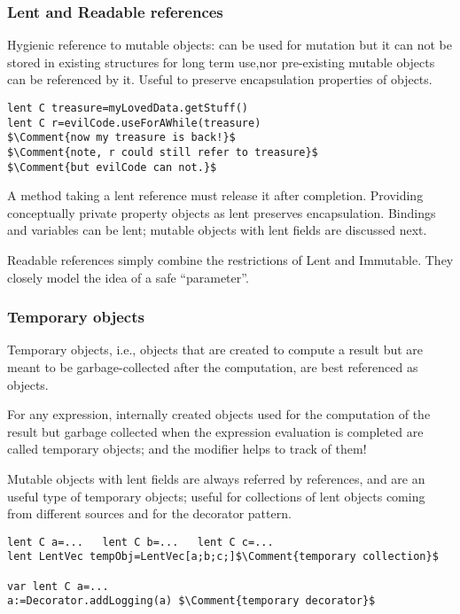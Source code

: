 \begin{frame}[fragile]
\frametitle{Lent and Readable references}
Hygienic reference to mutable objects: can be used 
for mutation but it can not be stored in existing structures for long term use,nor pre-existing mutable objects can be referenced by it. Useful to preserve encapsulation properties of objects.

\begin{NiceCode}{59ex}{0.8}
\begin{lstlisting}
lent C treasure=myLovedData.getStuff()
lent C r=evilCode.useForAWhile(treasure)
$\Comment{now my treasure is back!}$
$\Comment{note, r could still refer to treasure}$
$\Comment{but evilCode can not.}$
\end{lstlisting}
\end{NiceCode}
A method taking a lent reference must release it after completion.
Providing conceptually private property objects as lent preserves encapsulation.
Bindings and variables can be lent;
mutable objects with lent fields are discussed next.


Readable references simply combine the restrictions of Lent and Immutable. They closely model the idea of a safe ``parameter''.

\end{frame}

\begin{frame}[fragile]
\frametitle{Temporary objects}
Temporary objects, i.e., objects that are created to compute a result but
are meant to be garbage-collected after the computation,
are best referenced as \Q@lent@ objects. 

For any expression, internally created objects used for the computation of the result but garbage collected when the expression evaluation is completed are called temporary objects; and the \Q@lent@ modifier helps to track of them!

Mutable objects with lent fields are always referred by  \Q@lent@ references, and are
an useful type of 
temporary objects; 
useful for collections of lent objects coming from different sources
and for the decorator pattern.

\begin{NiceCode}{59ex}{0.8}
\begin{lstlisting}
lent C a=...   lent C b=...   lent C c=...
lent LentVec tempObj=LentVec[a;b;c;]$\Comment{temporary collection}$

var lent C a=...
a:=Decorator.addLogging(a) $\Comment{temporary decorator}$
\end{lstlisting}
\end{NiceCode}

\end{frame}

